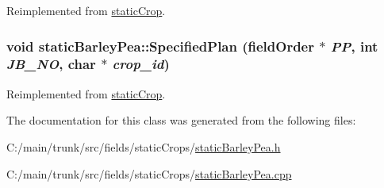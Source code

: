Reimplemented from \hyperlink{classstatic_crop_ab7763e4e6a0b9eff1788cb86ebad8170}{staticCrop}.\hypertarget{classstatic_barley_pea_ae0050aa14a078ae8fe7b047cd1f22465}{
\subsubsection[{SpecifiedPlan}]{\setlength{\rightskip}{0pt plus 5cm}void staticBarleyPea::SpecifiedPlan ({\bf fieldOrder} $\ast$ {\em PP}, \/  int {\em JB\_\-NO}, \/  char $\ast$ {\em crop\_\-id})}}
\label{classstatic_barley_pea_ae0050aa14a078ae8fe7b047cd1f22465}


Reimplemented from \hyperlink{classstatic_crop_af19d8a1e4f4833325f6712c22ede8b45}{staticCrop}.

The documentation for this class was generated from the following files:\begin{DoxyCompactItemize}
\item 
C:/main/trunk/src/fields/staticCrops/\hyperlink{static_barley_pea_8h}{staticBarleyPea.h}\item 
C:/main/trunk/src/fields/staticCrops/\hyperlink{static_barley_pea_8cpp}{staticBarleyPea.cpp}\end{DoxyCompactItemize}
